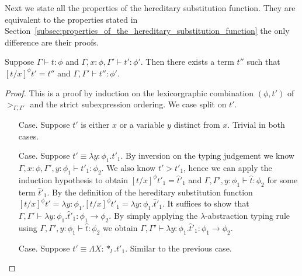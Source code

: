 \noindent Next we state all the properties of the hereditary
substitution function.  They are equivalent to the properties stated
in
Section~\ref{subsec:properties_of_the_hereditary_substitution_function}
the only difference are their proofs.
\begin{lemma}
  \label{lemma:total_ssf}
  Suppose $\Gamma \vdash t : \phi$ and $\Gamma, x:\phi, \Gamma' \vdash t':\phi'$. Then
  there exists a term $t''$ such that $[t/x]^\phi t' = t''$ and $\Gamma,\Gamma' \vdash t'':\phi'$.
\end{lemma}
\begin{proof}
  This is a proof by induction on the lexicorgraphic combination $(\phi, t')$ of $>_{\Gamma,\Gamma'}$ and
the strict subexpression ordering.  We case split on $t'$.

\begin{itemize}
\item[Case.] Suppose $t'$ is either $x$ or a variable $y$ distinct from $x$.  
  Trivial in both cases.
  
\item[Case.] Suppose $t' \equiv \lambda y:\phi_1.t'_1$.  By inversion on the
  typing judgement we know $\Gamma,x:\phi,\Gamma',y:\phi_1 \vdash t'_1:\phi_2$.
  We also know $t' > t'_1$, hence we can apply the induction hypothesis to obtain
  $[t/x]^\phi t'_1 = \hat{t}'_1$ and $\Gamma,\Gamma',y:\phi_1 \vdash \hat{t}:\phi_2$
  for some term $\hat{t}'_1$.  By the definition of the hereditary substitution function 
  $[t/x]^\phi t' = \lambda y:\phi_1.[t/x]^\phi t'_1 = \lambda y:\phi_1.\hat{t}'_1$.  It suffices
  to show that $\Gamma,\Gamma' \vdash \lambda y:\phi_1.\hat{t}'_1:\phi_1 \to \phi_2$.  
  By simply applying the $\lambda$-abstraction typing rule using
  $\Gamma,\Gamma',y:\phi_1 \vdash \hat{t}:\phi_2$ we obtain 
  $\Gamma,\Gamma' \vdash \lambda y:\phi_1.\hat{t}'_1:\phi_1 \to \phi_2$.
  
\item[Case.] Suppose $t' \equiv \Lambda X:*_l.t'_1$.  Similar to the previous case.
  

\end{itemize}
\end{proof}
